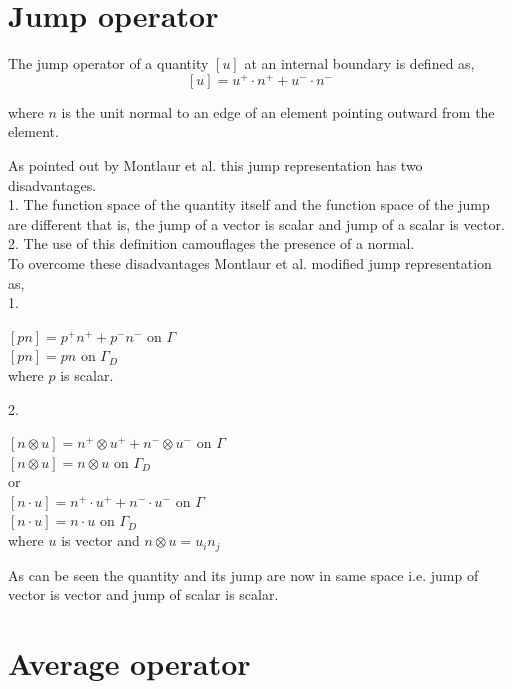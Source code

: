 \documentclass[a4paper,openany]{book}
\begin{document}
\section{Jump operator}

The jump operator of a quantity $[u]$ at an internal boundary is defined as,
\begin{equation}\label{jump operator}
[u]=u^+ \cdot n^+ + u^- \cdot n^-
\end{equation}

where $n$ is the unit normal to an edge of an element pointing outward from the element.

As pointed out by Montlaur et al. \cite{Montlaur2} this jump representation has two disadvantages.\\

1. The function space of the quantity itself and the function space of the jump are different that is, the jump of a vector is scalar and jump of a scalar is vector.\\
2. The use of this definition camouflages the presence of a normal.\\

To overcome these disadvantages Montlaur et al. \cite{Montlaur2} modified jump representation as,\\

1.  
\begin{center}
$[pn] = p^+ n^+ + p^- n^- $ on $\Gamma$\\
$[pn] = p n $ on $\Gamma_D$\\
where $p$ is scalar.
\end{center}

2. \\
\begin{center}
$[n \otimes u] = n^+ \otimes u^+ + n^- \otimes u^-$ on $\Gamma$\\
$[n \otimes u] = n \otimes u$ on $\Gamma_D$\\
 or \\
$[n \cdot u] = n^+ \cdot u^+ + n^- \cdot u^-$ on $\Gamma$\\
$[n \cdot u] = n \cdot u$ on $\Gamma_D$\\
where $u$ is vector and $n \otimes u = u_i n_j$\\ 
\end{center}

As can be seen the quantity and its jump are now in same space i.e. jump of vector is vector and jump of scalar is scalar.

\section{Average operator}
\end{document}
